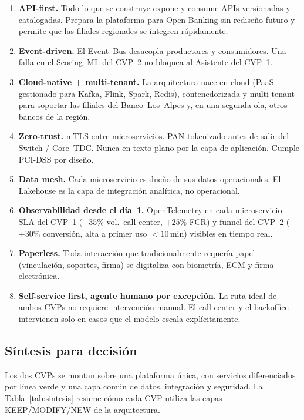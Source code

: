 \documentclass[11pt,letterpaper]{article}
\begin{document}
\begin{enumerate}[leftmargin=1.6em,topsep=2pt,itemsep=3pt]
  \item \textbf{API-first.} Todo lo que se construye expone y consume
        APIs versionadas y catalogadas. Prepara la plataforma para
        Open Banking sin rediseño futuro y permite que las filiales
        regionales se integren rápidamente.
  \item \textbf{Event-driven.} El Event~Bus desacopla productores y
        consumidores. Una falla en el Scoring~ML del CVP~2 no bloquea
        al Asistente del CVP~1.
  \item \textbf{Cloud-native + multi-tenant.} La arquitectura nace en
        cloud (PaaS gestionado para Kafka, Flink, Spark, Redis),
        contenedorizada y multi-tenant para soportar las filiales del
        Banco~Los~Alpes y, en una segunda ola, otros bancos de la
        región.
  \item \textbf{Zero-trust.} mTLS entre microservicios. PAN tokenizado
        antes de salir del Switch / Core~TDC. Nunca en texto plano por
        la capa de aplicación. Cumple PCI-DSS por diseño.
  \item \textbf{Data mesh.} Cada microservicio es dueño de sus datos
        operacionales. El Lakehouse es la capa de integración analítica,
        no operacional.
  \item \textbf{Observabilidad desde el día~1.} OpenTelemetry en cada
        microservicio. SLA del CVP~1 ($-35\%$ vol.\ call center,
        $+25\%$ FCR) y funnel del CVP~2 ($+30\%$ conversión, alta a
        primer uso $<10$\,min) visibles en tiempo real.
  \item \textbf{Paperless.} Toda interacción que tradicionalmente
        requería papel (vinculación, soportes, firma) se digitaliza
        con biometría, ECM y firma electrónica.
  \item \textbf{Self-service first, agente humano por excepción.} La
        ruta ideal de ambos CVPs no requiere intervención manual.
        El call center y el backoffice intervienen solo en casos
        que el modelo escala explícitamente.
\end{enumerate}

\subsection{Síntesis para decisión}
\label{sec:sintesis}

Los dos CVPs se montan sobre una plataforma única, con servicios
diferenciados por línea verde y una capa común de datos, integración y
seguridad. La Tabla~\ref{tab:sintesis} resume cómo cada CVP utiliza
las capas KEEP/MODIFY/NEW de la arquitectura.
\end{document}

